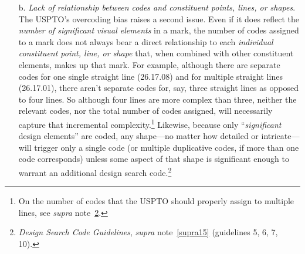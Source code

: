 \documentclass[letterpaper, 11pt, oneside]{article}
\begin{document}
\begin{enumerate}
Coders are also instructed to code visual elements in applicants' mark drawings \emph{even where applicants expressly disclaim those elements}. Such elements are typically shown in dashed lines. For example, adidas's registration for the mark \texttt{[image: RN\_3029127\_drawing]},\footnote{Registration No. 3,029,127.} which consists of adidas's three-stripe trade dress on a garment, expressly disclaims the garment on which the mark is shown, because adidas is claiming the design \emph{on} the garment, not the garment itself. Yet in addition to the design search code for straight lines (26.17.01), the USPTO also assigned this mark the design search code for jackets (09.03.01). This makes sense from the perspective of providing actual notice to potential infringers. The disclaimed matter is essential, because it is the commercial context in which adidas uses the mark. However, from the perspective of measuring mark complexity, the presence of two codes suggests that there are two significant elements in the mark when, arguably, we should focus only on the claimed matter, the three stripes, which amount to one element (or perhaps three distinct elements).\footnote{\label{supra26} Indeed, per its own guidance, the USPTO should actually have coded the adidas three-stripe mark for \emph{both} three lines \emph{and} a single line. \textit{See supra} note~\ref{supra25}.} Viewed from this angle, coding disclaimed matter contributes to a general tendency to overcode, rather than undercode. The upshot is that the relationship between a mark's significant design elements and the number of design search codes it has is far from perfectly linear. 

\item[b.] \textit{Lack of relationship between codes and constituent points, lines, or shapes}. The USPTO's overcoding bias raises a second issue. Even if it does reflect the \emph{number of significant visual elements} in a mark, the number of codes assigned to a mark does not always bear a direct relationship to each \emph{individual constituent point, line, or shape} that, when combined with other constituent elements, makes up that mark. For example, although there are separate codes for one single straight line (26.17.08) and for multiple straight lines (26.17.01), there aren't separate codes for, say, three straight lines as opposed to four lines. So although four lines are more complex than three, neither the relevant codes, nor the total number of codes assigned, will necessarily capture that incremental complexity.\footnote{On the number of codes that the USPTO should properly assign to multiple lines, see \textit{supra} note~\ref{supra26}.} Likewise, because only ``\emph{significant} design elements'' are coded, any shape—no matter how detailed or intricate—will trigger only a single code (or multiple duplicative codes, if more than one code corresponds) unless some aspect of that shape is significant enough to warrant an additional design search code.\footnote{\textit{Design Search Code Guidelines}, \textit{supra} note~\ref{supra15} (guidelines 5, 6, 7, 10).}


\end{enumerate}
\end{document}
